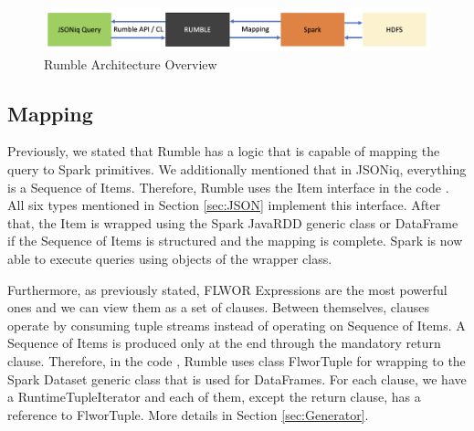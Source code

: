 \begin{figure}[h!]
	\includegraphics[width=\linewidth]{rumble_architecture.png}
	\caption{Rumble Architecture Overview}
	\label{fig:Rumble_Architecture}
\end{figure}

\subsection{Mapping}
\label{sec:RumbleMapping}
Previously, we stated that Rumble has a logic that is capable of mapping the query to Spark primitives. We additionally mentioned that in JSONiq, everything is a Sequence of Items. Therefore, Rumble uses the Item interface in the code \cite{RumbleRepository}. All six types mentioned in Section \ref{sec:JSON} implement this interface. After that, the Item is wrapped using the Spark JavaRDD generic class or DataFrame if the Sequence of Items is structured and the mapping is complete. Spark is now able to execute queries using objects of the wrapper class.

Furthermore, as previously stated, FLWOR Expressions are the most powerful ones and we can view them as a set of clauses. Between themselves, clauses operate by consuming tuple streams instead of operating on Sequence of Items. A Sequence of Items is produced only at the end through the mandatory return clause. Therefore, in the code \cite{RumbleRepository}, Rumble uses class FlworTuple for wrapping to the Spark Dataset generic class that is used for DataFrames. For each clause, we have a RuntimeTupleIterator and each of them, except the return clause, has a reference to FlworTuple. More details in Section \ref{sec:Generator}.

